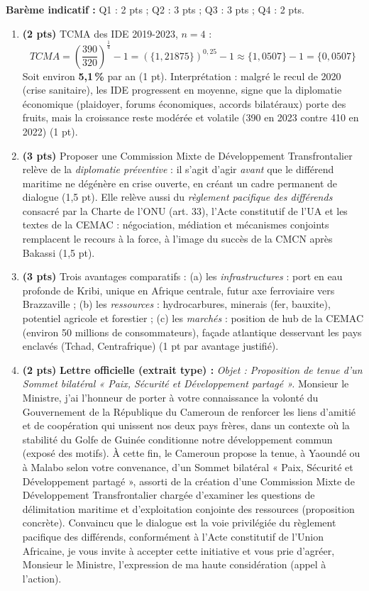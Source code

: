 \documentclass[11pt]{article}
\begin{document}
\begin{corrige}
\textbf{Barème indicatif :} Q1 : 2 pts ; Q2 : 3 pts ; Q3 : 3 pts ; Q4 : 2 pts.

\begin{enumerate}
    \item \textbf{(2 pts)} TCMA des IDE 2019-2023, $n = 4$ :
    \[ TCMA = \left(\frac{390}{320}\right)^{\frac{1}{4}} - 1 = (\{1,21875\})^{0,25} - 1 \approx \{1,0507\} - 1 = \{0,0507\} \]
    Soit environ \textbf{5,1\,\%} par an (1 pt). Interprétation : malgré le recul de 2020 (crise sanitaire), les IDE progressent en moyenne, signe que la diplomatie économique (plaidoyer, forums économiques, accords bilatéraux) porte des fruits, mais la croissance reste modérée et volatile (390 en 2023 contre 410 en 2022) (1 pt).
    \item \textbf{(3 pts)} Proposer une Commission Mixte de Développement Transfrontalier relève de la \emph{diplomatie préventive} : il s'agit d'agir \emph{avant} que le différend maritime ne dégénère en crise ouverte, en créant un cadre permanent de dialogue (1,5 pt). Elle relève aussi du \emph{règlement pacifique des différends} consacré par la Charte de l'ONU (art. 33), l'Acte constitutif de l'UA et les textes de la CEMAC : négociation, médiation et mécanismes conjoints remplacent le recours à la force, à l'image du succès de la CMCN après Bakassi (1,5 pt).
    \item \textbf{(3 pts)} Trois avantages comparatifs : (a) les \emph{infrastructures} : port en eau profonde de Kribi, unique en Afrique centrale, futur axe ferroviaire vers Brazzaville ; (b) les \emph{ressources} : hydrocarbures, minerais (fer, bauxite), potentiel agricole et forestier ; (c) les \emph{marchés} : position de hub de la CEMAC (environ 50 millions de consommateurs), façade atlantique desservant les pays enclavés (Tchad, Centrafrique) (1 pt par avantage justifié).
    \item \textbf{(2 pts)} \textbf{Lettre officielle (extrait type) :}
    \textit{Objet : Proposition de tenue d'un Sommet bilatéral « Paix, Sécurité et Développement partagé ».}
    Monsieur le Ministre, j'ai l'honneur de porter à votre connaissance la volonté du Gouvernement de la République du Cameroun de renforcer les liens d'amitié et de coopération qui unissent nos deux pays frères, dans un contexte où la stabilité du Golfe de Guinée conditionne notre développement commun (exposé des motifs). À cette fin, le Cameroun propose la tenue, à Yaoundé ou à Malabo selon votre convenance, d'un Sommet bilatéral « Paix, Sécurité et Développement partagé », assorti de la création d'une Commission Mixte de Développement Transfrontalier chargée d'examiner les questions de délimitation maritime et d'exploitation conjointe des ressources (proposition concrète). Convaincu que le dialogue est la voie privilégiée du règlement pacifique des différends, conformément à l'Acte constitutif de l'Union Africaine, je vous invite à accepter cette initiative et vous prie d'agréer, Monsieur le Ministre, l'expression de ma haute considération (appel à l'action).

\end{enumerate}
\end{corrige}
\end{document}
